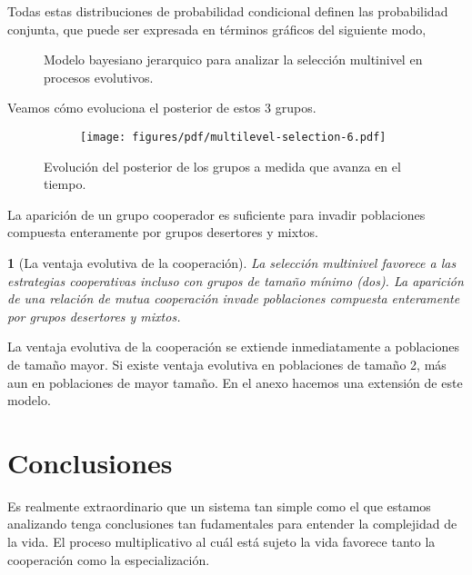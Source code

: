 \documentclass[a4paper,10pt]{article}
\newif\ifen
\newif\ifes
\newcommand{\en}[1]{\ifen#1\fi}
\newcommand{\es}[1]{\ifes#1\fi}
\newtheorem{conclution}{\en{Conclution}\es{Conclusión}}%
\begin{document}
Todas estas distribuciones de probabilidad condicional definen las probabilidad conjunta, que puede ser expresada en términos gráficos del siguiente modo,
%
\begin{figure}[H]
\centering
{}
\caption{
Modelo bayesiano jerarquico para analizar la selección multinivel en procesos evolutivos.
}
\label{fig:modelo_grafico}
\end{figure}
%
Veamos cómo evoluciona el posterior de estos 3 grupos.
%
\begin{figure}[H]
    \centering
    \begin{subfigure}[b]{0.66\textwidth}
    \texttt{[image: figures/pdf/multilevel-selection-6.pdf]}
    \end{subfigure}
    \caption{
    Evolución del posterior de los grupos a medida que avanza en el tiempo.
    }
    \label{fig:multilevel-selection-6}
\end{figure}
%
La aparición de un grupo cooperador es suficiente para invadir poblaciones compuesta enteramente por grupos desertores y mixtos.
%
\begin{conclution}[La ventaja evolutiva de la cooperación]
La selección multinivel favorece a las estrategias cooperativas incluso con grupos de tamaño mínimo (dos).
La aparición de una relación de mutua cooperación invade poblaciones compuesta enteramente por grupos desertores y mixtos.
\end{conclution}
%
La ventaja evolutiva de la cooperación se extiende inmediatamente a poblaciones de tamaño mayor.
Si existe ventaja evolutiva en poblaciones de tamaño 2, más aun en poblaciones de mayor tamaño.
En el anexo hacemos una extensión de este modelo.

\section{Conclusiones}

Es realmente extraordinario que un sistema tan simple como el que estamos analizando tenga conclusiones tan fudamentales para entender la complejidad de la vida.
El proceso multiplicativo al cuál está sujeto la vida favorece tanto la cooperación como la especialización.
\end{document}
